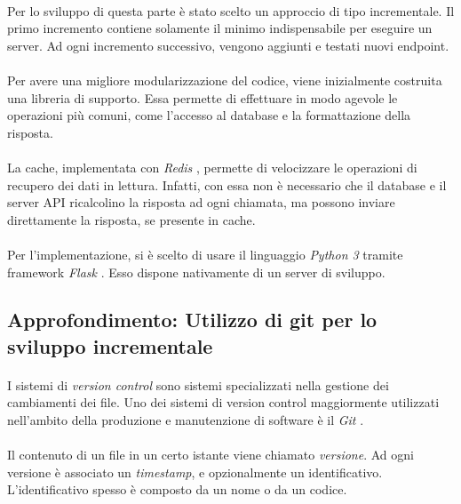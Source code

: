\documentclass[12pt,a4paper,twoside,english,italian]{book}
\begin{document}
\paragraph{} Per lo sviluppo di questa parte è stato scelto un approccio di tipo incrementale. Il primo incremento contiene solamente il minimo indispensabile per eseguire un server. Ad ogni incremento successivo, vengono aggiunti e testati nuovi endpoint.

\paragraph{} Per avere una migliore modularizzazione del codice, viene inizialmente costruita una libreria di supporto. Essa permette di effettuare in modo agevole le operazioni più comuni, come l'accesso al database e la formattazione della risposta. 

\paragraph{} La cache, implementata con \emph{Redis} \cite{redis}, permette di velocizzare le operazioni di recupero dei dati in lettura. Infatti, con essa non è necessario che il database e il server API ricalcolino la risposta ad ogni chiamata, ma possono inviare direttamente la risposta, se presente in cache.

\paragraph{} Per l'implementazione, si è scelto di usare il linguaggio \emph{Python 3} \cite{python} tramite framework \emph{Flask} \cite{flask}. Esso dispone nativamente di un server di sviluppo.  

\subsection{Approfondimento: Utilizzo di git per lo sviluppo incrementale}

\paragraph{} I sistemi di \emph{version control} sono sistemi specializzati nella gestione dei cambiamenti dei file. Uno dei sistemi di version control maggiormente utilizzati nell'ambito della produzione e manutenzione di software è il \emph{Git} \cite{git}.

\paragraph{} Il contenuto di un file in un certo istante viene chiamato \emph{versione}. Ad ogni versione è associato un \emph{timestamp}, e opzionalmente un identificativo. L'identificativo spesso è composto da un nome o da un codice. 
\end{document}
